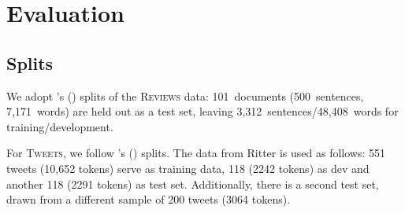 \documentclass[11pt]{article}
\newcommand{\citeposs}[1]{\citeauthor{#1}'s (\citeyear{#1})}
\newcommand{\ensuretext}[1]{#1}
\newcommand{\nssmarker}{\ensuretext{\textcolor{magenta}{\ensuremath{^{\textsc{NS}}_{\textsc{S}}}}}}
\newcommand{\arkcomment}[3]{\ensuretext{\textcolor{#3}{[#1 #2]}}}
\newcommand{\nss}[1]{\arkcomment{\nssmarker}{#1}{magenta}}
\newcommand{\finalversion}[1]{}
\newcommand{\longversion}[1]{#1} %
\begin{document}
\section{Evaluation}
\longversion{
\finalversion{\subsection{\nss{TODO}System Submission Process}

On May~5,~2015, teams will be furnished with the test data (minus the gold labels). 
They will have until May~10 to submit up to 3~system predictions for evaluation. 
The test data will include sentences from both evaluation domains, 
in a random order: to encourage robust systems, 
the domain of each sentence will not be marked at test time, 
and the proportion of sentences from each domain is not guaranteed to be 
the same in the trial, train, dev, and test sets.\nss{is this crazy?}}

\subsection{Splits}

We adopt \citeposs{schneider-14} splits of the \textsc{Reviews} data: 
101~documents (500~sentences, 7,171~words) are held out as a test set, 
leaving 3,312~sentences\slash 48,408~words for training\slash development.

For \textsc{Tweets}, 
we follow \citeposs{johannsen-14} splits\finalversion{: 
\nss{sizes of splits}}.
The data from Ritter is used as follows: 551 tweets (10,652 tokens) serve as training data, 118 (2242 tokens) as dev and another 118 (2291 tokens) as test set. Additionally, there is a second test set, drawn from a different sample of 200 tweets (3064 tokens).
}
\end{document}
